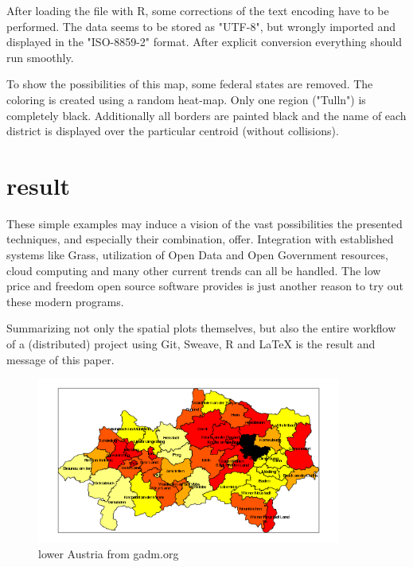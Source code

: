 \documentclass{ifacconf}
\begin{document}
After loading the file with R, some corrections of the text encoding have
to be performed. The data seems to be stored as "UTF-8", but wrongly
imported and displayed in the "ISO-8859-2" format. After explicit conversion
everything should run smoothly.

To show the possibilities of this map, some federal states are removed. 
The coloring is created using a random heat-map. Only one region ("Tulln")
is completely black. Additionally all borders are painted black and the name
of each district is displayed over the particular centroid (without collisions).



\section{result}
These simple examples 
may induce a vision  of the vast possibilities the presented techniques, and 
especially their combination, offer. Integration with established systems like Grass,
utilization of Open Data and Open Government resources, cloud computing and many other 
current trends can all be handled. The low price and
freedom open source software provides is just another reason to try out
these modern programs.

Summarizing not only the spatial plots themselves, but also the entire workflow
of a (distributed) project using Git, Sweave, R and LaTeX is the result and 
message of this paper.



\begin{figure}[h]
\begin{center}
\includegraphics[width=10cm]{pics/northAustria.png}    %
\caption{lower Austria from gadm.org} 
\label{fig:noe}
\end{center}
\end{figure}

   
\end{document}
